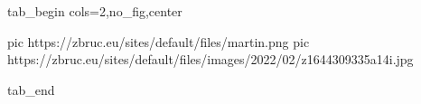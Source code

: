  
 
 
 
 


\ifcmt
  tab_begin cols=2,no_fig,center

     pic https://zbruc.eu/sites/default/files/martin.png
		 pic https://zbruc.eu/sites/default/files/images/2022/02/z1644309335a14i.jpg

  tab_end
\fi

